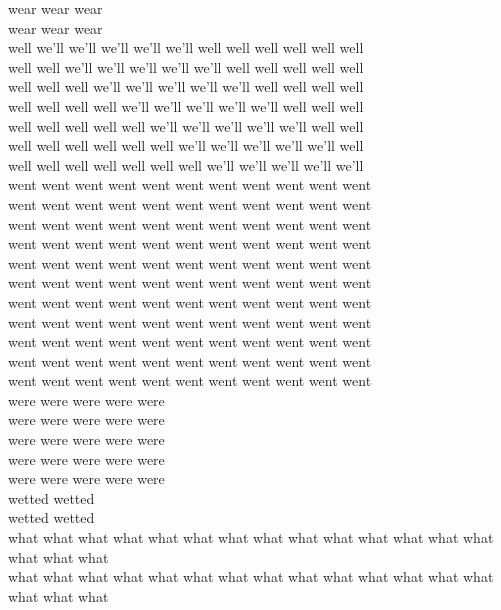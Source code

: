 wear wear wear\\
wear wear wear\\
well we'll we'll we'll we'll we'll well well well well well well\\
well well we'll we'll we'll we'll we'll well well well well well\\
well well well we'll we'll we'll we'll we'll well well well well\\
well well well well we'll we'll we'll we'll we'll well well well\\
well well well well well we'll we'll we'll we'll we'll well well\\
well well well well well well we'll we'll we'll we'll we'll well\\
well well well well well well well we'll we'll we'll we'll we'll\\
went went went went went went went went went went went\\
went went went went went went went went went went went\\
went went went went went went went went went went went\\
went went went went went went went went went went went\\
went went went went went went went went went went went\\
went went went went went went went went went went went\\
went went went went went went went went went went went\\
went went went went went went went went went went went\\
went went went went went went went went went went went\\
went went went went went went went went went went went\\
went went went went went went went went went went went\\
were were were were were\\
were were were were were\\
were were were were were\\
were were were were were\\
were were were were were\\
wetted wetted\\
wetted wetted\\
what what what what what what what what what what what what what what what what what\\
what what what what what what what what what what what what what what what what what\\
